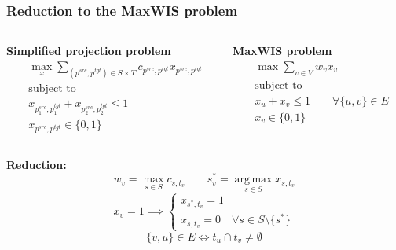 \documentclass{beamer}
\newcommand{\src}[1]{#1^{src}}
\newcommand{\tgt}[1]{#1^{tgt}}
\DeclareMathOperator*{\argmax}{arg\,max}
\begin{document}
\begin{frame}
  \frametitle{Reduction to the MaxWIS problem}
  \begin{columns}
    \begin{column}[t]{.5\textwidth}
      \centering\textbf{Simplified projection problem}
      \begin{align*}
        & \max\limits_x \sum\limits_{(\src{p}, \tgt{p}) \in S \times T} c_{\src{p}, \tgt{p}} x_{\src{p}, \tgt{p}}                                             \\
        & \text{subject to}                                                                                                                                   \\
        & x_{\src{p_1}, \tgt{p_1}} + x_{\src{p_2}, \tgt{p_2}} \leq 1\\
        & x_{\src{p}, \tgt{p}} \in \{ 0, 1 \}
      \end{align*}
    \end{column}
    \begin{column}[t]{.5\textwidth}
      \centering\textbf{MaxWIS problem}
      \begin{align*}
        & \max \sum\limits_{v \in V} w_v x_v                               \\
        & \text{subject to} \\
        & x_u + x_v \leq 1               \qquad \forall \{u, v\} \in E \\
        & x_v \in \{0, 1\}
      \end{align*}
    \end{column}
  \end{columns}

  \centering\textbf{Reduction:}
  \[
    w_v = \max\limits_{s \in S} c_{s, t_v} \qquad s^*_v = \argmax\limits_{s \in S} x_{s, t_v}
  \]
  \[
    x_v = 1 \implies
    \begin{cases}
      x_{s^*, t_v} = 1 \\
      x_{s, t_v} = 0 \quad \forall s \in S \setminus \{ s^* \}
    \end{cases}
  \]
  \[
    \{ v, u \} \in E \Leftrightarrow t_u \cap t_v \neq \emptyset
  \]
\end{frame}
\end{document}
